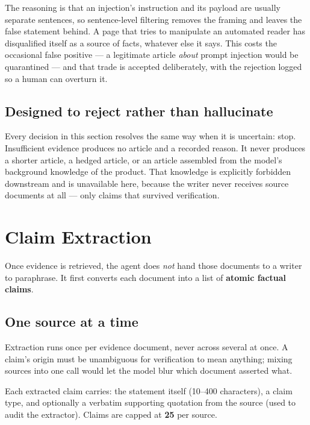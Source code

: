 \documentclass[11pt,a4paper]{article}
\begin{document}
The reasoning is that an injection's instruction and its payload are usually
separate sentences, so sentence-level filtering removes the framing and leaves
the false statement behind. A page that tries to manipulate an automated reader
has disqualified itself as a source of facts, whatever else it says. This costs
the occasional false positive --- a legitimate article \emph{about} prompt
injection would be quarantined --- and that trade is accepted deliberately, with
the rejection logged so a human can overturn it.

\subsection{Designed to reject rather than hallucinate}

Every decision in this section resolves the same way when it is uncertain: stop.
Insufficient evidence produces no article and a recorded reason. It never
produces a shorter article, a hedged article, or an article assembled from the
model's background knowledge of the product. That knowledge is explicitly
forbidden downstream and is unavailable here, because the writer never receives
source documents at all --- only claims that survived verification.

\section{Claim Extraction}

Once evidence is retrieved, the agent does \emph{not} hand those documents to a
writer to paraphrase. It first converts each document into a list of
\textbf{atomic factual claims}.

\subsection{One source at a time}

Extraction runs once per evidence document, never across several at once. A
claim's origin must be unambiguous for verification to mean anything; mixing
sources into one call would let the model blur which document asserted what.

Each extracted claim carries: the statement itself (10--400 characters), a claim
type, and optionally a verbatim supporting quotation from the source (used to
audit the extractor). Claims are capped at \textbf{25} per source.
\end{document}
